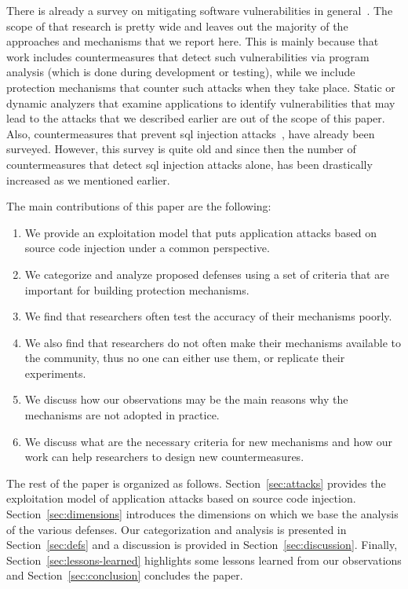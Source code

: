\documentclass[conference]{IEEEtran}
\begin{document}
There is already a survey on mitigating software vulnerabilities
in general~\cite{SZ12}. The scope of that
research is pretty wide and leaves out the majority of the
approaches and mechanisms that we report here.
This is mainly because that work includes countermeasures
that detect such vulnerabilities via program analysis
(which is done during development or testing), while
we include protection mechanisms that counter
such attacks when they take place. Static or
dynamic analyzers that examine applications to
identify vulnerabilities that may lead to the attacks
that we described earlier are out of the scope of this paper.
Also, countermeasures that prevent {\sc sql}
injection attacks~\cite{HVO06}, have already been surveyed.
However, this survey is quite old and since then
the number of countermeasures that detect {\sc sql}
injection attacks alone, has been drastically increased
as we mentioned earlier.

The main contributions of this paper are the following:

\begin{enumerate}
\item We provide an exploitation model that puts application attacks
  based on source code injection under a common
  perspective.
\item We categorize and analyze proposed defenses using a set of
  criteria that are important for building protection mechanisms.
\item We find that researchers often test the accuracy
  of their mechanisms poorly. 
\item We also find that researchers do not often make their mechanisms
  available to the community, thus no one can either use them,
  or replicate their experiments.
\item We discuss how our observations may be the main reasons why the
  mechanisms are not adopted in practice.
\item We discuss what are the necessary criteria for new mechanisms
  and how our work can help researchers to design new countermeasures.
\end{enumerate}

The rest of the paper is organized as follows.
Section~\ref{sec:attacks} provides the exploitation model
of application attacks based on source code injection.
Section~\ref{sec:dimensions} introduces the dimensions
on which we base the analysis of the various defenses.
Our categorization and analysis is presented in
Section~\ref{sec:defs} and a discussion is provided in
Section~\ref{sec:discussion}. Finally,
Section~\ref{sec:lessons-learned} highlights
some lessons learned from our observations
and Section~\ref{sec:conclusion} concludes the paper.
\end{document}

